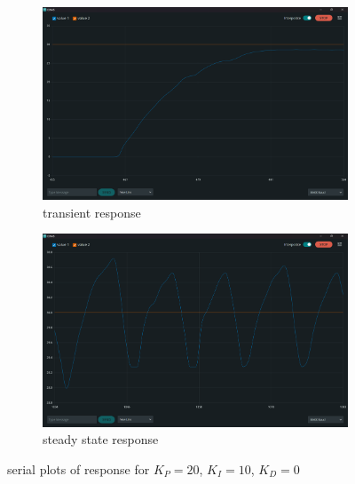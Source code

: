 \documentclass[12pt]{article}
\begin{document}
\begin{figure}[h]
    \centering
    \begin{subfigure}{.44\textwidth}
        \centering
        \includegraphics[width=0.95\linewidth]{images/q1/Transient_20_10_0.png}
		\caption{transient response}
    \end{subfigure}
    \begin{subfigure}{.44\textwidth}
        \centering
        \includegraphics[width=0.95\linewidth]{images/q1/SS_20_10_0.png} 
		\caption{steady state response}
    \end{subfigure}\vspace{-1mm}
    \caption{serial plots of response for $K_P=20$, $K_I=10$, $K_D=0$}
\end{figure}
\vspace{-5mm}
\end{document}
